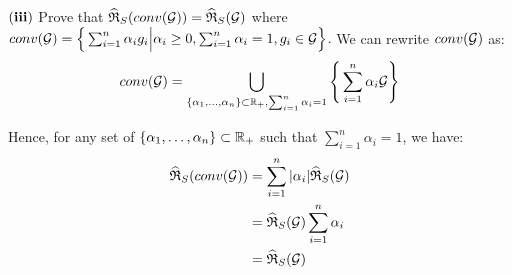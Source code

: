\begin{solution*}
    \begin{subproof}{\newline ${\bf (iii)}$ Prove that $\widehat{\mathfrak{R}}_S(conv(\mathcal{G}))=\widehat{\mathfrak{R}}_S(\mathcal{G})$ \newline where $conv(\mathcal{G})=\Big\{ \sum_{i=1}^n \alpha_ig_i\Big|\alpha_i\ge0, \sum_{i=1}^n\alpha_i=1, g_i\in\mathcal{G} \Big\}$.}
        We can rewrite $conv(\mathcal{G})$ as:
        \begin{align*}
            conv(\mathcal{G}) = \bigcup_{\{\alpha_1, \dots, \alpha_n\}\subset\mathbb{R}_+, \sum_{i=1}^n\alpha_i=1} \Bigg\{ \sum_{i=1}^n \alpha_i \mathcal{G} \Bigg\}
        \end{align*}

        \noindent Hence, for any set of $\{\alpha_1, \dots, \alpha_n\}\subset \mathbb{R}_+$ such that $\sum_{i=1}^n \alpha_i =1$, we have:
        \begin{align*}
            \widehat{\mathfrak{R}}_S(conv(\mathcal{G})) &= \sum_{i=1}^n |\alpha_i| \widehat{\mathfrak{R}}_S(\mathcal{G}) \\
                &= \widehat{\mathfrak{R}}_S(\mathcal{G}) \sum_{i=1}^n \alpha_i \\
                &= \widehat{\mathfrak{R}}_S(\mathcal{G})
        \end{align*}
    \end{subproof}
\end{solution*}

